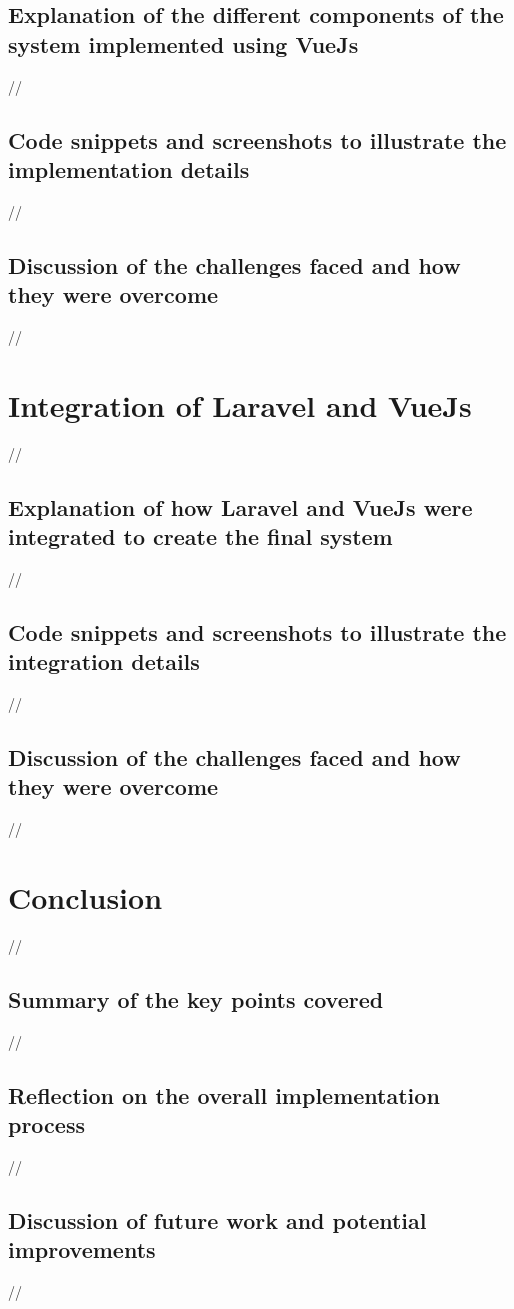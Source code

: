 \subsection {Explanation of the different components of the system implemented using VueJs}
//
\subsection {Code snippets and screenshots to illustrate the implementation details}
//
\subsection {Discussion of the challenges faced and how they were overcome}
//


\section {Integration of Laravel and VueJs}
//
\subsection {Explanation of how Laravel and VueJs were integrated to create the final system}
//
\subsection {Code snippets and screenshots to illustrate the integration details}
//
\subsection {Discussion of the challenges faced and how they were overcome}

//
    \section {Conclusion}
//
    \subsection {Summary of the key points covered}
//
    \subsection {Reflection on the overall implementation process}
//
    \subsection {Discussion of future work and potential improvements}

    //